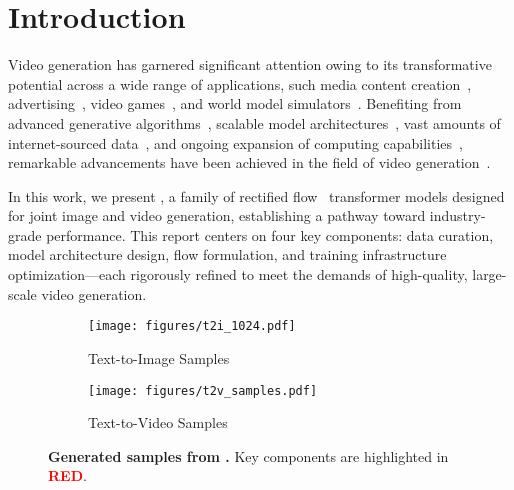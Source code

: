 \section{Introduction}

Video generation has garnered significant attention owing to its transformative potential across a wide range of applications, such media content creation~\citep{polyak2024movie}, advertising~\citep{zhang2024virbo,bacher2021advert}, video games~\citep{yang2024playable,valevski2024diffusion, oasis2024}, and world model simulators~\citep{ha2018world, videoworldsimulators2024, agarwal2025cosmos}. Benefiting from advanced generative algorithms~\citep{goodfellow2014generative, ho2020denoising, liu2023flow, lipman2023flow}, scalable model architectures~\citep{vaswani2017attention, peebles2023scalable}, vast amounts of internet-sourced data~\citep{chen2024panda, nan2024openvid, ju2024miradata}, and ongoing expansion of computing capabilities~\citep{nvidia2022h100, nvidia2023dgxgh200, nvidia2024h200nvl}, remarkable advancements have been achieved in the field of video generation~\citep{ho2022video, ho2022imagen, singer2023makeavideo, blattmann2023align, videoworldsimulators2024, kuaishou2024klingai, yang2024cogvideox, jin2024pyramidal, polyak2024movie, kong2024hunyuanvideo, ji2024prompt}.


In this work, we present \textbf{\ours}, a family of rectified flow~\citep{lipman2023flow, liu2023flow} transformer models designed for joint image and video generation, establishing a pathway toward industry-grade performance. This report centers on four key components: data curation, model architecture design, flow formulation, and training infrastructure optimization—each rigorously refined to meet the demands of high-quality, large-scale video generation.


\begin{figure}[ht]
    \centering
    \begin{subfigure}[b]{0.82\linewidth}
        \centering
        \texttt{[image: figures/t2i\_1024.pdf]}
        \caption{Text-to-Image Samples}\label{fig:main-demo-t2i}
    \end{subfigure}
    \vfill
    \begin{subfigure}[b]{0.82\linewidth}
        \centering
        \texttt{[image: figures/t2v\_samples.pdf]}
        \caption{Text-to-Video Samples}\label{fig:main-demo-t2v}
    \end{subfigure}
\caption{\textbf{Generated samples from \ours.} Key components are highlighted in \textcolor{red}{\textbf{RED}}.}\label{fig:main-demo}
\end{figure}



